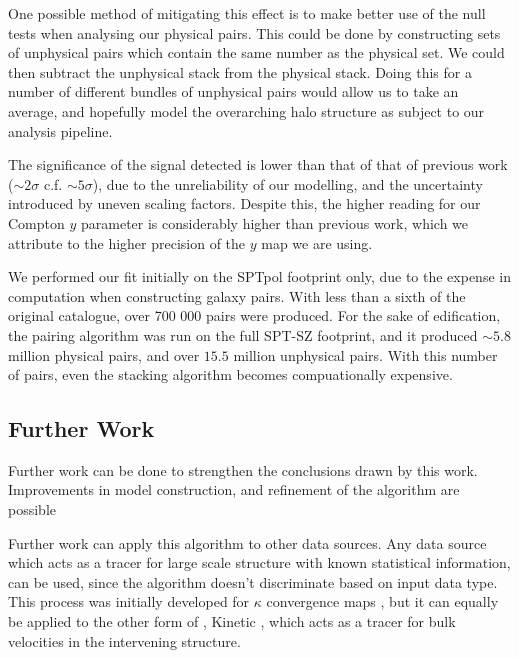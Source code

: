\par One possible method of mitigating this effect is to make better use of the null tests when analysing our physical pairs. This could be done by constructing sets of unphysical pairs which contain the same number as the physical set. We could then subtract the unphysical stack from the physical stack. Doing this for a number of different bundles of unphysical pairs would allow us to take an average, and hopefully model the overarching halo structure as subject to our analysis pipeline. 

\par The significance of the signal detected is lower than that of that of previous work ($\sim 2\sigma$ c.f. $\sim 5 \sigma$), due to the unreliability of our modelling, and the uncertainty introduced by uneven scaling factors. Despite this, the higher reading for our Compton $y$ parameter is considerably higher than previous work, which we attribute to the higher precision of the $y$ map we are using. 

\par We performed our fit initially on the SPTpol footprint only, due to the expense in computation when constructing galaxy pairs. With less than a sixth of the original catalogue, over 700 000 pairs were produced. For the sake of edification, the pairing algorithm was run on the full SPT-SZ footprint, and it produced $\sim 5.8$ million physical pairs, and over $15.5$ million unphysical pairs. With this number of pairs, even the stacking algorithm becomes compuationally expensive. 

\subsection{Further Work}

\par Further work can be done to strengthen the conclusions drawn by this work. Improvements in model construction, and refinement of the algorithm are possible 

\par Further work can apply this algorithm to other data sources. Any data source which acts as a tracer for large scale structure with known statistical information, can be used, since the algorithm doesn't discriminate based on input data type. This process was initially developed for $\kappa$ convergence maps \citep{2016MNRAS.457.2391C}, but it can equally be applied to the other form of \sze, Kinetic \sze , which acts as a tracer for bulk velocities in the intervening structure. 

